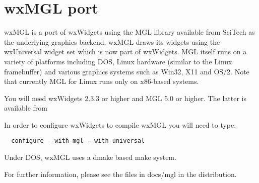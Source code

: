 \section{wxMGL port}\label{wxmglport}

wxMGL is a port of wxWidgets using the MGL library available
from SciTech as the underlying graphics backend. wxMGL draws
its widgets using the wxUniversal widget set which is now
part of wxWidgets. MGL itself runs on a variety of platforms
including DOS, Linux hardware (similar to the Linux framebuffer)
and various graphics systems such as Win32, X11 and OS/2.
Note that currently MGL for Linux runs only on x86-based systems.

You will need wxWidgets 2.3.3 or higher and MGL 5.0 or higher.
The latter is available from


In order to configure wxWidgets to compile wxMGL you will
need to type:

\begin{verbatim}
  configure --with-mgl --with-universal
\end{verbatim}

Under DOS, wxMGL uses a dmake based make system.

For further information, please see the files in docs/mgl
in the distribution.

